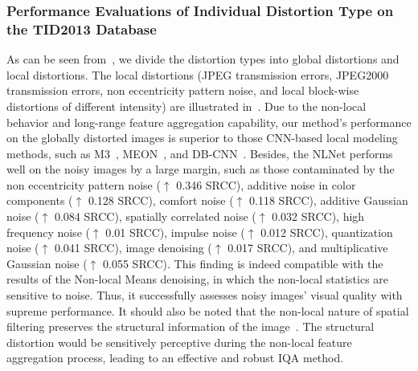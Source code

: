 	\subsubsection{Performance Evaluations of Individual Distortion Type on the TID2013 Database}
	As can be seen from~, we divide the distortion types into global distortions and local distortions. The local distortions (JPEG transmission errors, JPEG2000 transmission errors, non eccentricity pattern noise, and local block-wise distortions of different intensity) are illustrated in~. Due to the non-local behavior and long-range feature aggregation capability, our method's performance on the globally distorted images is superior to those CNN-based local modeling methods, such as M3~\citep{xue2014blind}, MEON~\citep{ma2017end}, and DB-CNN~\citep{zhang2018blind}. Besides, the NLNet performs well on the noisy images by a large margin, such as those contaminated by the non eccentricity pattern noise ($\uparrow$ 0.346 SRCC), additive noise in color components ($\uparrow$ 0.128  SRCC), comfort noise ($\uparrow$ 0.118 SRCC), additive Gaussian noise ($\uparrow$ 0.084  SRCC), spatially correlated noise ($\uparrow$ 0.032 SRCC), high frequency noise ($\uparrow$ 0.01 SRCC), impulse noise ($\uparrow$ 0.012 SRCC), quantization noise ($\uparrow$ 0.041 SRCC), image denoising ($\uparrow$ 0.017 SRCC), and multiplicative Gaussian noise ($\uparrow$ 0.055 SRCC). This finding is indeed compatible with the results of the Non-local Means denoising, in which the non-local statistics are sensitive to noise. Thus, it successfully assesses noisy images' visual quality with supreme performance. It should also be noted that the non-local nature of spatial filtering preserves the structural information of the image~\citep{buades2011non}. The structural distortion would be sensitively perceptive during the non-local feature aggregation process, leading to an effective and robust IQA method.
